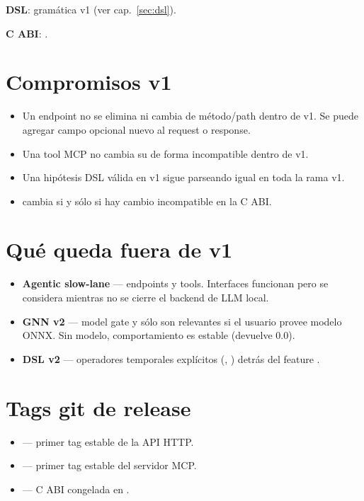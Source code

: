 \textbf{DSL}: gramática v1 (ver cap.~\ref{sec:dsl}).

\textbf{C ABI}: .

\section{Compromisos v1}

\begin{itemize}
    \item Un endpoint  no se elimina ni cambia de
    método/path dentro de v1. Se puede agregar campo opcional nuevo
    al request o response.
    \item Una tool MCP  no cambia su 
    de forma incompatible dentro de v1.
    \item Una hipótesis DSL válida en v1 sigue parseando igual en
    toda la rama v1.
    \item {} cambia si y sólo si hay cambio
    incompatible en la C ABI.
\end{itemize}

\section{Qué queda fuera de v1}

\begin{itemize}
    \item \textbf{Agentic slow-lane} —  endpoints y
    tools. Interfaces funcionan pero se considera
     mientras no se cierre el backend de LLM
    local.
    \item \textbf{GNN v2} — model gate y
     sólo son relevantes si
    el usuario provee modelo ONNX. Sin modelo, comportamiento es
    estable (devuelve 0.0).
    \item \textbf{DSL v2} — operadores temporales explícitos
    (, ) detrás del feature
    .
\end{itemize}

\section{Tags git de release}

\begin{itemize}
    \item {} — primer tag estable de la API
    HTTP.
    \item {} — primer tag estable del
    servidor MCP.
    \item {} — C ABI congelada en
    .
\end{itemize}

